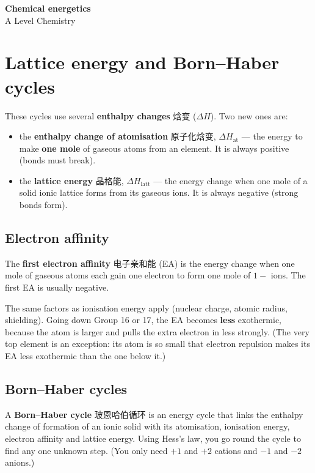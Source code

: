 \documentclass[11pt]{article}
\begin{document}
\begin{center}
  {\LARGE\bfseries Chemical energetics}\\[0.35em]
  {\large A Level Chemistry}
\end{center}
\vspace{0.6em}

\section*{Lattice energy and Born–Haber cycles}

These cycles use several \textbf{enthalpy changes} 焓变 ($\Delta H$). Two new ones are:

\begin{itemize}
\item the \textbf{enthalpy change of atomisation} 原子化焓变, $\Delta H_{\text{at}}$ — the energy to make \textbf{one mole} of gaseous atoms from an element. It is always positive (bonds must break).

\item the \textbf{lattice energy} 晶格能, $\Delta H_{\text{latt}}$ — the energy change when one mole of a solid ionic lattice forms from its gaseous ions. It is always negative (strong bonds form).

\end{itemize}

\subsection*{Electron affinity}

The \textbf{first electron affinity} 电子亲和能 (EA) is the energy change when one mole of gaseous atoms each gain one electron to form one mole of $1-$ ions. The first EA is usually negative.

The same factors as ionisation energy apply (nuclear charge, atomic radius, shielding). Going down Group 16 or 17, the EA becomes \textbf{less} exothermic, because the atom is larger and pulls the extra electron in less strongly. (The very top element is an exception: its atom is so small that electron repulsion makes its EA less exothermic than the one below it.)

\subsection*{Born–Haber cycles}

A \textbf{Born–Haber cycle} 玻恩哈伯循环 is an energy cycle that links the enthalpy change of formation of an ionic solid with its atomisation, ionisation energy, electron affinity and lattice energy. Using Hess's law, you go round the cycle to find any one unknown step. (You only need $+1$ and $+2$ cations and $-1$ and $-2$ anions.)
\end{document}
